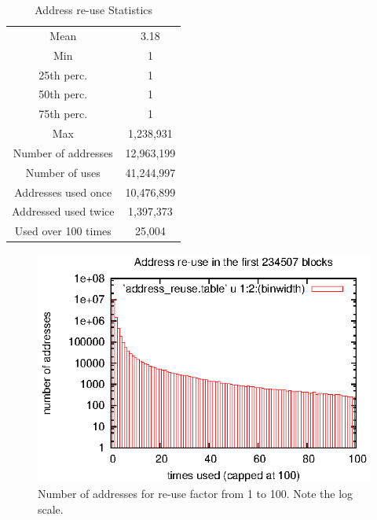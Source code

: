 \documentclass[journal]{IEEEtran}
\begin{document}
\begin{table}[!t]
\renewcommand{\arraystretch}{1.3}
\caption{Address re-use Statistics}
\label{table_example}
\centering
\begin{tabular}{|cc|}
\hline
Mean & 3.18\\
Min & 1\\
25th perc. & 1 \\
50th perc. & 1 \\
75th perc. & 1 \\
Max & 1,238,931\\
Number of addresses & 12,963,199 \\
Number of uses & 41,244,997 \\
Addresses used once & 10,476,899 \\
Addressed used twice & 1,397,373\\
Used over 100 times & 25,004 \\
\hline
\end{tabular}
\end{table}

\begin{figure}[!t]
\centering
\includegraphics[width=\linewidth]{figures/address-reuse.eps}
\caption{Number of addresses for re-use factor from 1 to 100. Note the log scale.}
\label{fig:address-reuse}
\end{figure}
\end{document}
